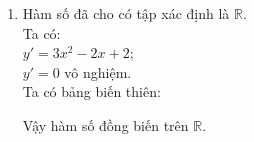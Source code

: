 \begin{vd}
{\begin{enumerate}
\begin{center}
            \end{center}
            Vậy hàm số nghịch biến trên $\mathbb{R}$.
            \item %
            Hàm số đã cho có tập xác định là $\mathbb{R}$.\\
            Ta có:\\ $y'=3x^2-2x+2$;\\
            $y'=0$ vô nghiệm.\\
            Ta có bảng biến thiên:
            \begin{center}
            \end{center}
            Vậy hàm số đồng biến trên $\mathbb{R}$.
        \end{enumerate}
    }
\end{vd}
